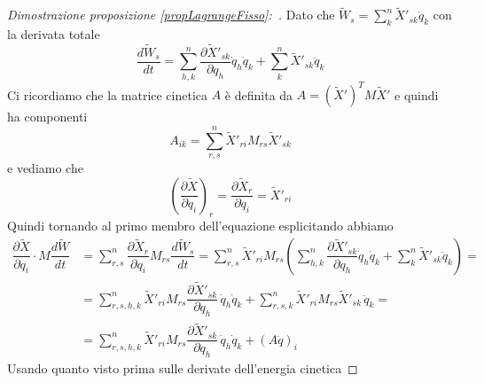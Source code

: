 \documentclass[11pt,a4paper,twoside]{book}
\newenvironment{dimo}[1][\proofname]{
	\begin{tcolorbox}[
	breakable, 
	enhanced, 
	interior hidden, 
	frame hidden, 
	borderline west = {1pt}{0pt}{gray}, 
	top=0pt, bottom=0pt, left=0pt]
\begin{proof}[#1:~]
}
{
\end{proof}
\end{tcolorbox}
}
\theoremstyle{esss}
\theoremstyle{dotless}
\numberwithin{equation}{section} %
\begin{document}
\begin{dimo}[Dimostrazione proposizione \ref{propLagrangeFisso}]
Dato che $\tilde{W}_{s}=\sum_k^n \tilde{X}'_{sk} \dot{q}_k$ con la derivata totale
\[
\dfrac{d\tilde{W}_s}{dt}=\sum_{h,k}^n \dfrac{\partial \tilde{X}'_{sk}}{\partial q_h}\dot{q}_h\dot{q}_k + \sum_{k}^n \tilde{X}'_{sk} \ddot{q}_k
\]
Ci ricordiamo che la matrice cinetica $A$ è definita da $A=(\tilde{X}')^T M \tilde{X}'$ e quindi ha componenti
\[
A_{ik}=\sum_{r,s}^n \tilde{X}'_{ri} M_{rs} \tilde{X}'_{sk}
\]
e vediamo che
\[
\left( \dfrac{\partial \tilde{X}}{\partial q_i} \right)_r=\dfrac{\partial \tilde{X}_r}{\partial q_i}=\tilde{X}'_{ri}
\]
Quindi tornando al primo membro dell'equazione esplicitando abbiamo
\begin{align*}
\dfrac{\partial \tilde{X}}{\partial q_i} \cdot M\dfrac{d\tilde{W}}{dt}&=
\sum_{r,s}^n \dfrac{\partial \tilde{X}_r}{\partial q_i} M_{rs} \dfrac{d\tilde{W}_s}{dt}= \sum_{r,s}^n \tilde{X}'_{ri} M_{rs} \left( \sum_{h,k}^n \dfrac{\partial \tilde{X}'_{sk}}{\partial q_h}\dot{q}_h\dot{q}_k + \sum_{k}^n \tilde{X}'_{sk} \ddot{q}_k \right)=\\
&=\sum_{r,s,h,k}^n \tilde{X}'_{ri}M_{rs}\dfrac{\partial \tilde{X}'_{sk}}{\partial q_h} \, \dot{q}_h\dot{q}_k +
\sum_{r,s,k}^n \tilde{X}'_{ri}M_{rs}\tilde{X}'_{sk} \, \ddot{q}_k = \\
&= \sum_{r,s,h,k}^n \tilde{X}'_{ri}M_{rs}\dfrac{\partial\tilde{X}'_{sk}}{\partial q_h} \, \dot{q}_h\dot{q}_k + \left( A \ddot{q} \right)_i
\end{align*}
Usando quanto visto prima sulle derivate dell'energia cinetica 


\end{dimo}
\end{document}

